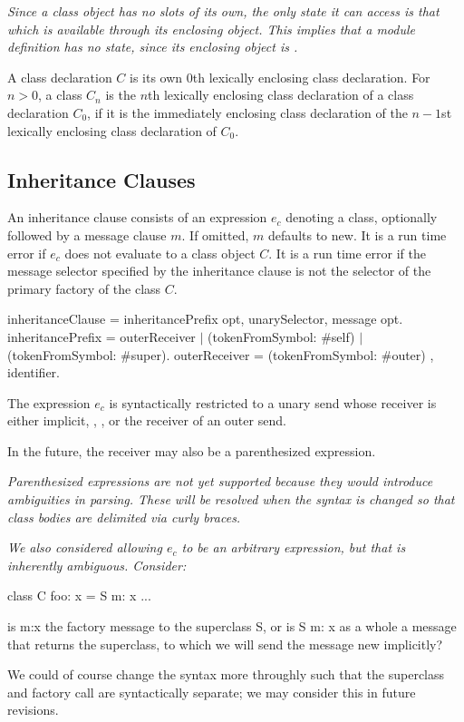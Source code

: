 \documentclass{article}
\newcommand{\code}[1]{{\sf #1}}
\begin{document}
{\it
Since a class object has no slots of its own, the only state it can access is that which is available through its enclosing object. This implies that a module definition has no state, since its enclosing object is \NIL.
}

A class declaration $C$ is its own 0th lexically enclosing class declaration.  For $n > 0$, a class $C_n$ is the $n$th lexically enclosing class declaration of a class declaration $C_0$, if it is the immediately enclosing class declaration of the $n-1$st lexically enclosing class declaration of $C_0$.


\subsection{Inheritance Clauses}
\label{inheritanceClauses}

 An inheritance clause consists of an expression $e_c$ denoting a class, optionally followed by a message clause $m$.  If omitted, $m$ defaults to \code{new}.  It is a run time error if $e_c$ does not evaluate to a class object $C$.  
It is a run time error if the message selector  specified by the inheritance clause is not the selector of the primary factory of the class $C$.
 
  \begin{newspeak}
inheritanceClause = inheritancePrefix opt, unarySelector, message opt.
inheritancePrefix = outerReceiver $|$  
                              (tokenFromSymbol: \#self) $|$  
                              (tokenFromSymbol: \#super).
outerReceiver = (tokenFromSymbol: \#outer) , identifier.
\end{newspeak}
 
The expression $e_c$ is syntactically restricted to a unary send whose receiver is either implicit, \SELF{}, \SUPER{}, or the receiver of an outer send. %

In the future, the receiver may also be a parenthesized expression.
 
 {\em Parenthesized expressions are not yet supported because they would introduce ambiguities in parsing. These will be resolved when the syntax is changed so that class bodies are delimited via curly braces. }
 
 {\em
We also considered allowing $e_c$ to be an arbitrary expression, but that is inherently ambiguous. Consider:

class C foo: x = S m: x ...

  is m:x the factory message to the superclass S, or is S m: x as a whole a message that returns the superclass, to which we will send the message new implicitly? 
  
 We could of course change the syntax more throughly such that the superclass and factory call are syntactically separate; we may consider this in future revisions. 
  }
  
\end{document}
